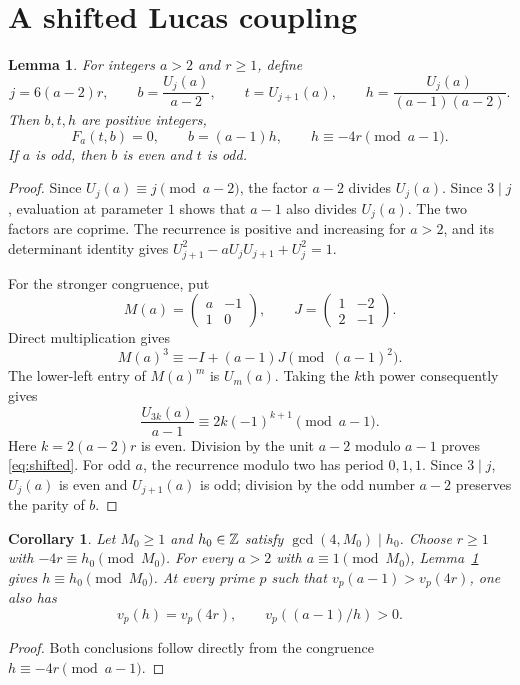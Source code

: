 \documentclass[11pt,a4paper]{article}
\newtheorem{lemma}[theorem]{Lemma}
\newtheorem{corollary}[theorem]{Corollary}
\begin{document}
\section{A shifted Lucas coupling}

\begin{lemma}\label{lem:shifted}
For integers $a>2$ and $r\ge1$, define
\[
 j=6(a-2)r,\qquad
 b=\frac{U_j(a)}{a-2},\qquad
 t=U_{j+1}(a),\qquad
 h=\frac{U_j(a)}{(a-1)(a-2)}.
\]
Then $b,t,h$ are positive integers,
\begin{equation}\label{eq:shifted}
 F_a(t,b)=0,\qquad b=(a-1)h,\qquad
                         h\equiv-4r\pmod{a-1}.
\end{equation}
If $a$ is odd, then $b$ is even and $t$ is odd.
\end{lemma}
\begin{proof}
Since $U_j(a)\equiv j\pmod{a-2}$, the factor $a-2$ divides
$U_j(a)$. Since $3\mid j$, evaluation at parameter $1$ shows
that $a-1$ also divides $U_j(a)$. The two factors are coprime.
The recurrence is positive and increasing for $a>2$, and its
determinant identity gives
$U_{j+1}^2-aU_jU_{j+1}+U_j^2=1$.

For the stronger congruence, put
\[
 M(a)=\begin{pmatrix}a&-1\\1&0\end{pmatrix},\qquad
 J=\begin{pmatrix}1&-2\\2&-1\end{pmatrix}.
\]
Direct multiplication gives
\[
 M(a)^3\equiv-I+(a-1)J\pmod{(a-1)^2}.
\]
The lower-left entry of $M(a)^m$ is $U_m(a)$. Taking the $k$th
power consequently gives
\[
 \frac{U_{3k}(a)}{a-1}
              \equiv2k(-1)^{k+1}\pmod{a-1}.
\]
Here $k=2(a-2)r$ is even. Division by the unit $a-2$ modulo
$a-1$ proves \eqref{eq:shifted}. For odd $a$, the recurrence
modulo two has period $0,1,1$. Since $3\mid j$, $U_j(a)$ is
even and $U_{j+1}(a)$ is odd; division by the odd number $a-2$
preserves the parity of $b$.
\end{proof}

\begin{corollary}\label{cor:finite}
Let $M_0\ge1$ and $h_0\in\mathbb Z$ satisfy
$\gcd(4,M_0)\mid h_0$. Choose $r\ge1$ with
$-4r\equiv h_0\pmod{M_0}$. For every $a>2$ with
$a\equiv1\pmod{M_0}$, Lemma~\ref{lem:shifted} gives
$h\equiv h_0\pmod{M_0}$. At every prime $p$ such that
$v_p(a-1)>v_p(4r)$, one also has
\[
                  v_p(h)=v_p(4r),\qquad
                  v_p((a-1)/h)>0.
\]
\end{corollary}
\begin{proof}
Both conclusions follow directly from the congruence
$h\equiv-4r\pmod{a-1}$.
\end{proof}
\end{document}
